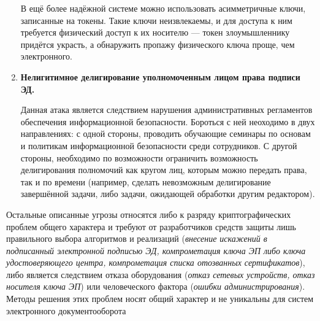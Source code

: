 \begin{enumerate}
	В ещё более надёжной системе можно использовать асимметричные ключи, записанные на токены. Такие ключи неизвлекаемы, и для доступа к ним требуется физический доступ к их носителю --- токен злоумышленнику придётся украсть, а обнаружить пропажу физического ключа проще, чем электронного.

	\item \textbf{Нелигитимное делигирование уполномоченным лицом права подписи ЭД.}

	Данная атака является следствием нарушения административных регламентов обеспечения информационной безопасности. Бороться с ней неоходимо в двух направлениях: с одной стороны, проводить обучающие семинары по основам и политикам информационной безопасности среди сотрудников. С другой стороны, необходимо по возможности ограничить возможность делигирования полномочий как кругом лиц, которым можно передать права, так и по времени (например, сделать невозможным делигирование завершённой задачи, либо задачи, ожидающей обработки другим редактором).
\end{enumerate}

\vspace{\baselineskip}
Остальные описанные угрозы относятся либо к разряду криптографических проблем общего характера и требуют от разработчиков средств защиты лишь правильного выбора алгоритмов и реализаций (\textit{внесение искажений в подписанный электронной подписью ЭД, компрометация ключа ЭП либо ключа удостоверяющего центра, компрометация списка отозванных сертификатов}), либо является следствием отказа оборудования (\textit{отказ сетевых устройств, отказ носителя ключа ЭП}) или человеческого фактора (\textit{ошибки администрирования}). Методы решения этих проблем носят общий характер и не уникальны для систем электронного документооборота 